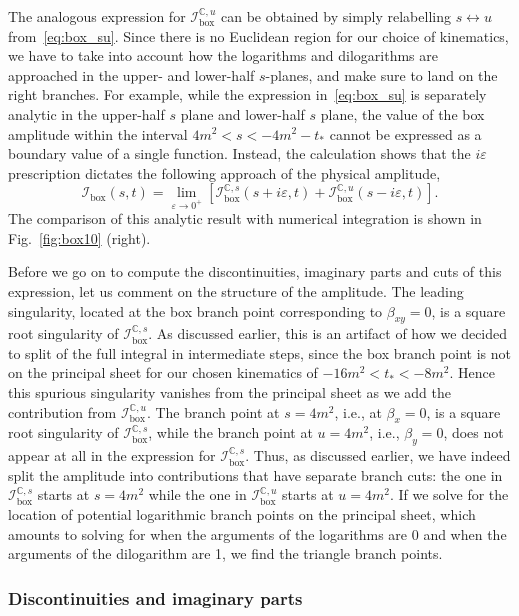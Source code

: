 \documentclass[12pt]{article}
\numberwithin{figure}{section}
\def \be {\begin{equation}}
\def \ee {\end{equation}}
\def \C {\mathbb{C}}
\def \I {\mathcal{I}}
\def \boxx {\mathrm{box}}
\begin{document}
	The analogous expression for $\I_\boxx^{\C,u}$ can be obtained by simply relabelling $s \leftrightarrow u$ from~\eqref{eq:box_su}.
	Since there is no Euclidean region for our choice of kinematics, we have to take into account how the logarithms and dilogarithms are approached in the upper- and lower-half $s$-planes, and make sure to land on the right branches. 
	For example, while the expression in~\eqref{eq:box_su} is separately analytic in the upper-half $s$ plane and lower-half $s$ plane, the value of the box amplitude within the interval $4m^2 < s < -4m^2 {-} t_\ast$ cannot be expressed as a boundary value of a single function. Instead, the calculation shows that the $i \varepsilon$ prescription dictates the following approach of the physical amplitude,
	\be\label{eq:box-final} 
	    \I_\boxx(s,t) =  \lim_{\varepsilon\to 0^+} \left[ \I_\boxx^{\C,s} (s+i\varepsilon,t) + \I_\boxx^{\C,u} (s-i\varepsilon,t) \right].
	\ee 
	The comparison of this analytic result with numerical integration is shown in Fig.~\ref{fig:box10} (right).
	
	Before we go on to compute the discontinuities, imaginary parts and cuts of this expression, let us comment on the structure of the amplitude. The leading singularity, located at the box branch point corresponding to $\beta_{xy}=0$, is a square root singularity of $\I_\boxx^{\C,s}$. As discussed earlier, this is an artifact of how we decided to split of the full integral in intermediate steps, since the box branch point is not on the principal sheet for our chosen kinematics of $-16 m^2 < t_\ast < - 8 m^2$. Hence this spurious singularity vanishes from the principal sheet as we add the contribution from $\I_\boxx^{\C,u}$. The branch point at $s=4 m^2$, i.e., at $\beta_x = 0$, is a square root singularity of $\I_\boxx^{\C,s}$, while the branch point at $u=4 m^2$, i.e., $\beta_y=0$, does not appear at all in the expression for $\I_\boxx^{\C,s}$. Thus, as discussed earlier, we have indeed split the amplitude into contributions that have separate branch cuts: the one in $\I_\boxx^{\C,s}$ starts at $s=4 m^2$ while the one in $\I_\boxx^{\C,u}$ starts at $u=4 m^2$. If we solve for the location of potential logarithmic branch points on the principal sheet, which amounts to solving for when the arguments of the logarithms are 0 and when the arguments of the dilogarithm are 1, we find the triangle branch points.
	
	
	
	
	
	
	\subsubsection{Discontinuities and imaginary parts} 
	
\end{document}
